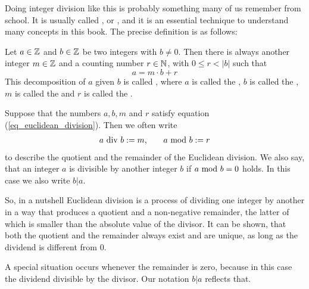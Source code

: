 Doing integer division like this is probably something many of us remember from school. It is 
usually called , or , and it is an essential technique to understand many concepts in this book. The precise definition is as follows:

Let $ a \in \mathbb{Z} $ and $ b \in \mathbb{Z} $ be two integers with $b\neq 0$. Then there is always another integer $ m \in \mathbb{Z} $ and a counting number $ r \in \mathbb{N} $, with $ 0 \leq r <|b| $ such that
\begin{equation}
\label{eq_euclidean_division}
a = m \cdot b + r
\end{equation}
This decomposition of $a$ given $b$ is called , where $ a $ is called the , $ b $ is called the , $m$ is called the  and $r$ is called the . 
\begin{notation}
\label{eq_euclidean_division_notation}
Suppose that the numbers $ a, b, m $ and $ r $ satisfy equation (\ref{eq_euclidean_division}). Then we often write 
\begin{equation}
\label{def_integer_division_and_modulus}
\begin{array}{lcr}
a \text{ div } b: = m, & & a \text{ mod } b: = r 
\end{array}
\end{equation}
to describe the quotient and the remainder of the Euclidean division. We also say, that an integer $ a $ is divisible by another integer $ b $ if $ a \text{ mod } b = 0 $ holds. In this case we also write $ b | a $.
\end{notation}
So, in a nutshell Euclidean division is a process of dividing one integer by another in a way that produces a quotient and a non-negative remainder, the latter of which is smaller than the absolute value of the divisor. It can be shown, that both the quotient and the remainder always exist and are unique, as long as the dividend is different from $0$.

A special situation occurs whenever the remainder is zero, because in this case the dividend  divisible by the divisor. Our notation $b | a$ reflects that. 


